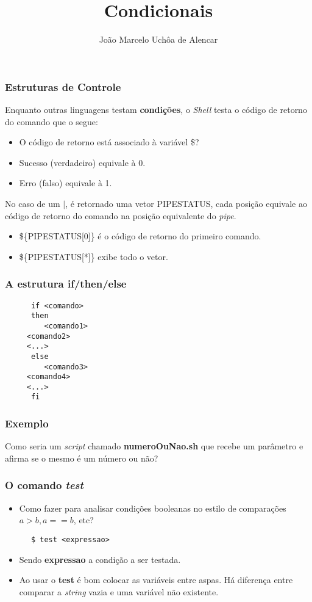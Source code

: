 \documentclass{beamer}
\title{Condicionais}
\author[João Marcelo Uchôa de Alencar]{João Marcelo Uchôa de Alencar}
\institute{Universidade Federal do Ceará - Quixadá}
\begin{document}
   \begin{frame}
      \titlepage
   \end{frame}

   \begin{frame}
      \frametitle{Estruturas de Controle}
      Enquanto outras linguagens testam \textbf{condições}, o \textit{Shell} testa o código de retorno do comando que o segue:
      \begin{itemize}
         \item O código de retorno está associado à variável \$?
	      \item Sucesso (verdadeiro) equivale à 0.
	      \item Erro (falso) equivale à 1.
      \end{itemize}
      No caso de um $|$, é retornado uma vetor PIPESTATUS, cada posição equivale ao código de retorno do comando na posição equivalente do \textit{pipe}.
      \begin{itemize}
         \item \$\{PIPESTATUS[0]\} é o código de retorno do primeiro comando.
	      \item \$\{PIPESTATUS[*]\} exibe todo o vetor.
      \end{itemize}
   \end{frame}

   \begin{frame}[fragile]
      \frametitle{A estrutura if\slash then\slash else}
      \begin{verbatim}
      if <comando>
      then
         <comando1>
	 <comando2>
	 <...>
      else
         <comando3>
	 <comando4>
	 <...>
      fi
      \end{verbatim}
\end{frame}

   \begin{frame}
      \frametitle{Exemplo}
      Como seria um \textit{script} chamado \textbf{numeroOuNao.sh} que recebe um parâmetro e afirma se o mesmo é um número ou não?
   \end{frame}

   \begin{frame}[fragile]
      \frametitle{O comando \textit{test}}

      \begin{itemize}
         \item Como fazer para analisar condições booleanas no estilo de comparações $a > b , a == b$, etc?
      \end{itemize}

      \begin{verbatim}
      $ test <expressao>
      \end{verbatim}

      \begin{itemize}
         \item Sendo \textbf{expressao} a condição a ser testada.
         \item Ao usar o \textbf{test} é bom colocar as variáveis entre aspas. Há diferença entre comparar a \textit{string} vazia e uma variável não existente.
      \end{itemize}
\end{frame}
\end{document}
